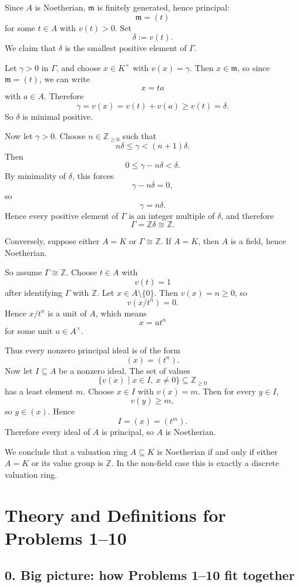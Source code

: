 \documentclass[12pt,a4paper,oneside]{report}
\theoremstyle{notespace}
\begin{document}
Since \(A\) is Noetherian, \(\mathfrak m\) is finitely generated, hence principal:
\[
\mathfrak m=(t)
\]
for some \(t\in A\) with \(v(t)>0\). Set
\[
\delta:=v(t).
\]
We claim that \(\delta\) is the smallest positive element of \(\Gamma\).

Let \(\gamma>0\) in \(\Gamma\), and choose \(x\in K^\times\) with \(v(x)=\gamma\). Then \(x\in \mathfrak m\), so since \(\mathfrak m=(t)\), we can write
\[
x=ta
\]
with \(a\in A\). Therefore
\[
\gamma=v(x)=v(t)+v(a)\ge v(t)=\delta.
\]
So \(\delta\) is minimal positive.

Now let \(\gamma>0\). Choose \(n\in\mathbb Z_{\ge 0}\) such that
\[
n\delta\le \gamma < (n+1)\delta.
\]
Then
\[
0\le \gamma-n\delta<\delta.
\]
By minimality of \(\delta\), this forces
\[
\gamma-n\delta=0,
\]
so
\[
\gamma=n\delta.
\]
Hence every positive element of \(\Gamma\) is an integer multiple of \(\delta\), and therefore
\[
\Gamma=\mathbb Z\delta\cong \mathbb Z.
\]

Conversely, suppose either \(A=K\) or \(\Gamma\cong \mathbb Z\). If \(A=K\), then \(A\) is a field, hence Noetherian.

So assume \(\Gamma\cong \mathbb Z\). Choose \(t\in A\) with
\[
v(t)=1
\]
after identifying \(\Gamma\) with \(\mathbb Z\). Let \(x\in A\setminus\{0\}\). Then \(v(x)=n\ge 0\), so
\[
v(x/t^n)=0.
\]
Hence \(x/t^n\) is a unit of \(A\), which means
\[
x=ut^n
\]
for some unit \(u\in A^\times\).

Thus every nonzero principal ideal is of the form
\[
(x)=(t^n).
\]
Now let \(I\subseteq A\) be a nonzero ideal. The set of values
\[
\{v(x)\mid x\in I,\ x\neq 0\}\subseteq \mathbb Z_{\ge 0}
\]
has a least element \(m\). Choose \(x\in I\) with \(v(x)=m\). Then for every \(y\in I\),
\[
v(y)\ge m,
\]
so \(y\in (x)\). Hence
\[
I=(x)=(t^m).
\]
Therefore every ideal of \(A\) is principal, so \(A\) is Noetherian.

We conclude that a valuation ring \(A\subseteq K\) is Noetherian if and only if either \(A=K\) or its value group is \(\mathbb Z\). In the non-field case this is exactly a discrete valuation ring.

\chapter{Theory and Definitions for Problems 1--10}

\section{0. Big picture: how Problems 1--10 fit together}
\end{document}
